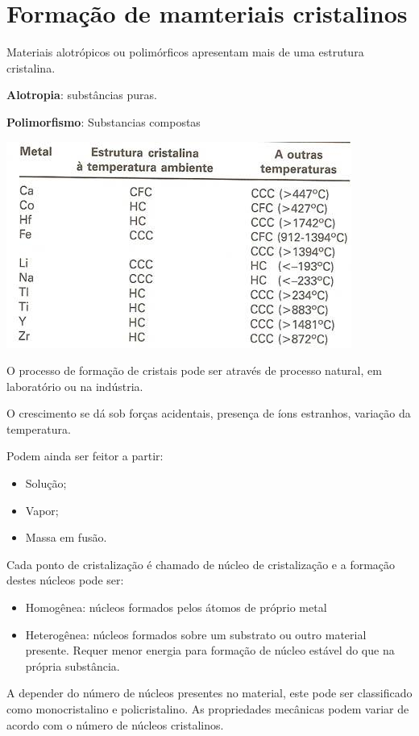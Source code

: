 


\section{Formação de mamteriais cristalinos}
Materiais alotrópicos ou polimórficos apresentam mais de uma estrutura cristalina.

\textbf{Alotropia}: substâncias puras.

\textbf{Polimorfismo}: Substancias compostas

\includegraphics[scale=0.4,trim={0 0 0 0}]{figures/estruturaTemp}

O processo de formação de cristais pode ser através de processo natural, em laboratório ou na indústria.

O crescimento se dá sob forças acidentais, presença de íons estranhos, variação da temperatura.

Podem ainda ser feitor a partir:

\begin{itemize}
	\item Solução;
	\item Vapor;
	\item Massa em fusão.
\end{itemize}


Cada ponto de cristalização é chamado de núcleo de cristalização e a formação destes núcleos pode ser:

\begin{itemize}
	\item Homogênea: núcleos formados pelos átomos de próprio metal 
	\item Heterogênea: núcleos formados sobre um substrato ou outro material presente. Requer menor energia para formação de núcleo estável do que na própria substância.
\end{itemize}

A depender do número de núcleos presentes no material, este pode ser classificado como monocristalino e policristalino. As propriedades mecânicas podem variar de acordo com o número de núcleos cristalinos.

